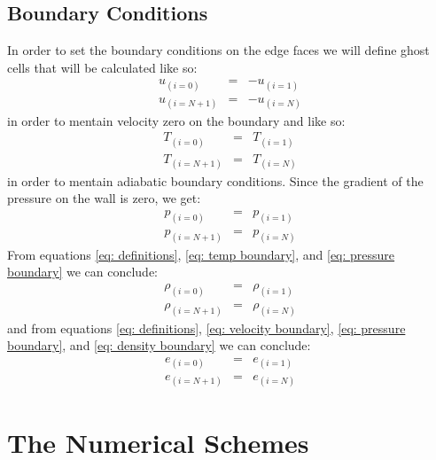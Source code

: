 \documentclass[11pt, a4paper]{article}
\begin{document}
\subsection{Boundary Conditions}
In order to set the boundary conditions on the edge faces we will define ghost cells that will be calculated like so:
\begin{equation}
    \begin{array}{lcl}
        u_{\left(i=0\right)} &=& -u_{\left(i=1\right)} \\
        u_{\left(i=N+1\right)} &=& -u_{\left(i=N\right)}
    \end{array}
    \label{eq: velocity boundary}
\end{equation}
in order to mentain velocity zero on the boundary and like so:
\begin{equation}
    \begin{array}{lcl}
        T_{\left(i=0\right)} &=& T_{\left(i=1\right)} \\
        T_{\left(i=N+1\right)} &=& T_{\left(i=N\right)}
    \end{array}
    \label{eq: temp boundary}
\end{equation}
in order to mentain adiabatic boundary conditions.
Since the gradient of the pressure on the wall is zero, we get:
\begin{equation}
    \begin{array}{lcl}
        p_{\left(i=0\right)} &=& p_{\left(i=1\right)} \\
        p_{\left(i=N+1\right)} &=& p_{\left(i=N\right)}
    \end{array}
    \label{eq: pressure boundary}
\end{equation}
From equations \ref{eq: definitions}, \ref{eq: temp boundary}, and \ref{eq: pressure boundary} we can conclude:
\begin{equation}
    \begin{array}{lcl}
        \rho_{\left(i=0\right)} &=& \rho_{\left(i=1\right)} \\
        \rho_{\left(i=N+1\right)} &=& \rho_{\left(i=N\right)}
    \end{array}
    \label{eq: density boundary}
\end{equation}
and from equations \ref{eq: definitions}, \ref{eq: velocity boundary}, \ref{eq: pressure boundary}, and \ref{eq: density boundary} we can conclude:
\begin{equation}
    \begin{array}{lcl}
        e_{\left(i=0\right)} &=& e_{\left(i=1\right)} \\
        e_{\left(i=N+1\right)} &=& e_{\left(i=N\right)}
    \end{array}
    \label{eq: energy boundary}
\end{equation}

\section{The Numerical Schemes}
\end{document}

